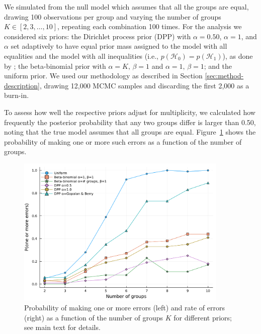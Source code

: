 \documentclass[11pt,a4paper]{article}
\theoremstyle{definition} %
\theoremstyle{case}
\begin{document}
We simulated from the null model which assumes that all the groups are equal, drawing 100 observations per group and varying the number of groups $K \in [2, 3, \dots, 10]$, repeating each combination 100 times. For the analysis we considered six priors: the Dirichlet process prior (DPP) with $\alpha = 0.50$, $\alpha = 1$, and $\alpha$ set adaptively to have equal prior mass assigned to the model with all equalities and the model with all inequalities (i.e., $p(\mathcal{H}_0) = p(\mathcal{H}_1)$), as done by \textcite{gopalan1998bayesian}; the beta-binomial prior with $\alpha = K , \, \beta = 1$ and $\alpha = 1, \, \beta = 1$; and the uniform prior. We used our methodology as described in Section \ref{sec:method-description}, drawing 12,000 MCMC samples and discarding the first 2,000 as a burn-in.

To assess how well the respective priors adjust for multiplicity, we calculated how frequently the posterior probability that any two groups differ is larger than 0.50, noting that the true model assumes that all groups are equal. Figure~\ref{fig:small_simulation} shows the probability of making one or more such errors as a function of the number of groups.
\begin{figure}
    \centering
    \includegraphics[width=0.90\textwidth]{figures/one_or_more_errors2.pdf}
    \caption{Probability of making one or more errors (left) and rate of errors (right) as a function of the number of groups $K$ for different priors; see main text for details.}
    \label{fig:small_simulation}
\end{figure}
\end{document}
